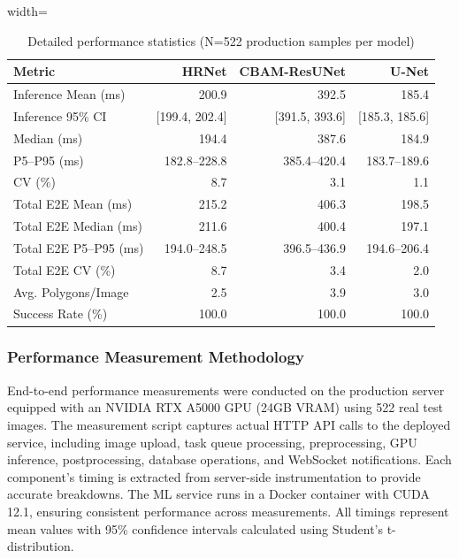 \documentclass[preprint,12pt]{elsarticle}
\begin{document}
\begin{table}[H]
\centering
\caption{Detailed performance statistics (N=522 production samples per model)}
\label{tab:performance-stats}
\begin{adjustbox}{width=\textwidth}
\begin{tabular}{@{}lrrr@{}}
\toprule
\textbf{Metric} & \textbf{HRNet} & \textbf{CBAM-ResUNet} & \textbf{U-Net} \\
\midrule
Inference Mean (ms) & 200.9 & 392.5 & 185.4 \\
Inference 95\% CI & [199.4, 202.4] & [391.5, 393.6] & [185.3, 185.6] \\
Median (ms) & 194.4 & 387.6 & 184.9 \\
P5--P95 (ms) & 182.8--228.8 & 385.4--420.4 & 183.7--189.6 \\
CV (\%) & 8.7 & 3.1 & 1.1 \\
Total E2E Mean (ms) & 215.2 & 406.3 & 198.5 \\
Total E2E Median (ms) & 211.6 & 400.4 & 197.1 \\
Total E2E P5--P95 (ms) & 194.0--248.5 & 396.5--436.9 & 194.6--206.4 \\
Total E2E CV (\%) & 8.7 & 3.4 & 2.0 \\
Avg. Polygons/Image & 2.5 & 3.9 & 3.0 \\
Success Rate (\%) & 100.0 & 100.0 & 100.0 \\
\bottomrule
\end{tabular}
\end{adjustbox}
\end{table}

\subsubsection{Performance Measurement Methodology}

End-to-end performance measurements were conducted on the production server equipped with an NVIDIA RTX A5000 GPU (24GB VRAM) using 522 real test images. The measurement script captures actual HTTP API calls to the deployed service, including image upload, task queue processing, preprocessing, GPU inference, postprocessing, database operations, and WebSocket notifications. Each component's timing is extracted from server-side instrumentation to provide accurate breakdowns. The ML service runs in a Docker container with CUDA 12.1, ensuring consistent performance across measurements. All timings represent mean values with 95\% confidence intervals calculated using Student's t-distribution.
\end{document}

